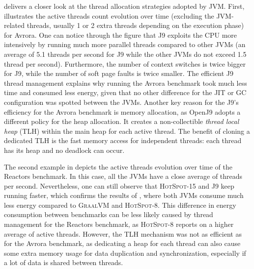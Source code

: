  delivers a closer look at the thread allocation strategies adopted by JVM.
First,  illustrates the active threads count evolution over time (excluding the JVM-related threads, usually 1 or 2 extra threads depending on the execution phase) for \textsf{Avrora}.
One can notice through the figure that \textsc{J9} exploits the CPU more intensively by running much more parallel threads compared to other JVMs (an average of 5.1 threads per second for \textsc{J9} while the other JVMs do not exceed 1.5 thread per second).
Furthermore, the number of context switches is twice bigger for \textsc{J9}, while the number of soft page faults is twice smaller.
The efficient \textsc{J9} thread management explains why running the \textsf{Avrora} benchmark took much less time and consumed less energy, given that no other difference for the JIT or GC configuration was spotted between the JVMs.
Another key reason for the \textsc{J9}'s efficiency for the \textsf{Avrora} benchmark is memory allocation, as \textsf{OpenJ9} adopts a different policy for the heap allocation.
It creates a non-collectible \emph{thread local heap} (TLH) within the main heap for each active thread.
The benefit of cloning a dedicated TLH is the fast memory access for independent threads: each thread has its heap and no deadlock can occur.

The second example in  depicts the active threads evolution over time of the \textsf{Reactors} benchmark.
In this case, all the JVMs have a close average of threads per second.
Nevertheless, one can still observe that \textsc{HotSpot-15} and \textsc{J9} keep running faster, which confirms the results of , where both JVMs consume much less energy compared to \textsc{GraalVM} and \textsc{HotSpot-8}.
This difference in energy consumption between benchmarks can be less likely caused by thread management for the \textsf{Reactors} benchmark, as \textsc{HotSpot-8} reports on a higher average of active threads.
However, the TLH mechanism was not as efficient as for the \textsf{Avrora} benchmark, as dedicating a heap for each thread can also cause some extra memory usage for data duplication and synchronization, especially if a lot of data is shared between threads.


